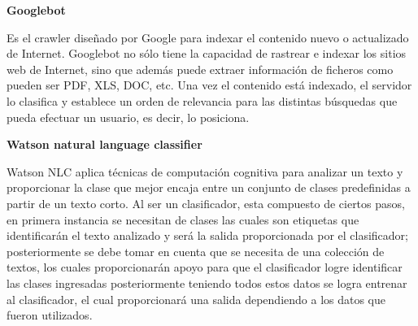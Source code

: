 \begin{large}
	 \textbf{Googlebot}\\
\end{large}

Es el crawler diseñado por Google para indexar el contenido nuevo o actualizado de Internet.
Googlebot\cite{nueve} no sólo tiene la capacidad de rastrear e indexar los sitios web de Internet, sino que además puede extraer información de ficheros como pueden ser PDF, XLS, DOC, etc.
Una vez el contenido está indexado, el servidor lo clasifica y establece un orden de relevancia para las distintas búsquedas que pueda efectuar un usuario, es decir, lo posiciona.\\



\begin{large}
	 \textbf{Watson natural language classifier}\\
\end{large}

Watson NLC \cite{diez} aplica técnicas de computación cognitiva para analizar un texto y proporcionar la clase que mejor encaja entre un conjunto de clases predefinidas a partir de un texto corto.
Al ser un clasificador, esta compuesto de ciertos pasos, en primera instancia se necesitan de clases las cuales son etiquetas que identificarán el texto analizado y será la salida proporcionada por el clasificador; posteriormente se debe tomar en cuenta que se necesita de una colección de textos, los cuales proporcionarán apoyo para que el clasificador logre identificar las clases ingresadas posteriormente teniendo todos estos datos se logra entrenar al clasificador, el cual proporcionará una salida dependiendo a los datos que fueron utilizados.


